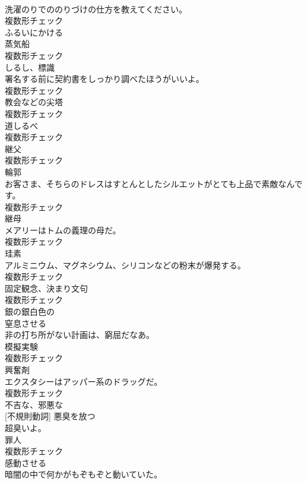 \documentclass[8pt]{extreport}
\begin{document}
\begin{CJK}{UTF8}{min}
\\	洗濯のりでののりづけの仕方を教えてください。	
\\	複数形チェック
\\	[動詞]	ふるいにかける	
\\	[名詞]	蒸気船	
\\	複数形チェック
\\	[名詞]	しるし、標識	
\\	署名する前に契約書をしっかり調べたほうがいいよ。	
\\	複数形チェック
\\	[名詞]	教会などの尖塔	
\\	複数形チェック
\\	[名詞]	道しるべ	
\\	複数形チェック
\\	[名詞]	継父	
\\	複数形チェック
\\	[名詞]	輪郭	
\\	お客さま、そちらのドレスはすとんとしたシルエットがとても上品で素敵なんです。	
\\	複数形チェック
\\	[名詞]	継母	
\\	メアリーはトムの義理の母だ。	
\\	複数形チェック
\\	[名詞]	珪素	
\\	アルミニウム、マグネシウム、シリコンなどの粉末が爆発する。	
\\	複数形チェック
\\	[名詞]	固定観念、決まり文句	
\\	複数形チェック
\\	[形容詞]	銀の銀白色の	
\\	[動詞]	窒息させる	
\\	非の打ち所がない計画は、窮屈だなあ。	
\\	[名詞]	模擬実験	
\\	複数形チェック
\\	[名詞]	興奮剤	
\\	エクスタシーはアッパー系のドラッグだ。	
\\	複数形チェック
\\	[形容詞]	不吉な、邪悪な	
\\	[動詞] [不規則動詞]	悪臭を放つ	
\\	超臭いよ。	
\\	[名詞]	罪人	
\\	複数形チェック
\\	[形容詞]	感動させる	
\\	暗闇の中で何かがもぞもぞと動いていた。	

\end{CJK}
\end{document}
